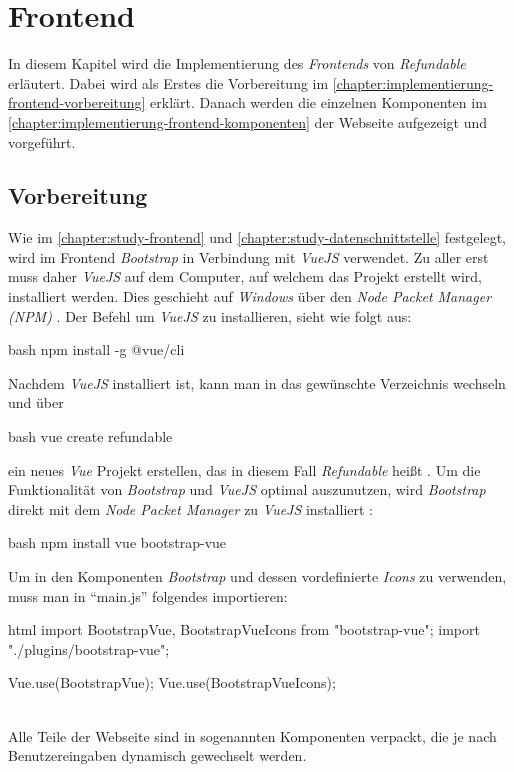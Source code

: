 \section{Frontend}
\label{chapter:implementierung-frontend}
In diesem Kapitel wird die Implementierung des \textit{Frontends} von \textit{Refundable} erläutert. Dabei wird als Erstes die Vorbereitung im \autoref{chapter:implementierung-frontend-vorbereitung} erklärt. Danach werden die einzelnen Komponenten im \autoref{chapter:implementierung-frontend-komponenten} der Webseite aufgezeigt und vorgeführt.
\subsection{Vorbereitung}
\label{chapter:implementierung-frontend-vorbereitung}
Wie im \autoref{chapter:study-frontend} und \autoref{chapter:study-datenschnittstelle} festgelegt, wird im Frontend \textit{Bootstrap} in Verbindung mit \textit{VueJS} verwendet. Zu aller erst muss daher \textit{VueJS} auf dem Computer, auf welchem das Projekt erstellt wird, installiert werden. Dies geschieht auf \textit{Windows} über den \textit{Node Packet Manager (NPM)} \cite{vue-install}. Der Befehl um \textit{VueJS} zu installieren, sieht wie folgt aus:
\begin{code}{bash}
	npm install -g @vue/cli
\end{code}
Nachdem \textit{VueJS} installiert ist, kann man in das gewünschte Verzeichnis wechseln und über
\begin{code}{bash}
	vue create refundable
\end{code}
ein neues \textit{Vue} Projekt erstellen, das in diesem Fall \textit{Refundable} heißt \cite{vue-create-project}. Um die Funktionalität von \textit{Bootstrap} und \textit{VueJS} optimal auszunutzen, wird \textit{Bootstrap} direkt mit dem \textit{Node Packet Manager} zu \textit{VueJS} installiert \cite{bootstrap-vue-getting-started}:
\begin{code}{bash}
	npm install vue bootstrap-vue
\end{code}
Um in den Komponenten \textit{Bootstrap} und dessen vordefinierte \textit{Icons} zu verwenden, muss man in \enquote{main.js} folgendes importieren:
\begin{code}{html}
	import { BootstrapVue, BootstrapVueIcons } from "bootstrap-vue";
	import "./plugins/bootstrap-vue";
	
	Vue.use(BootstrapVue);
	Vue.use(BootstrapVueIcons);
\end{code}
	\label{list:requcommands} ~\\
Alle Teile der Webseite sind in sogenannten Komponenten verpackt, die je nach Benutzereingaben dynamisch gewechselt werden. 

